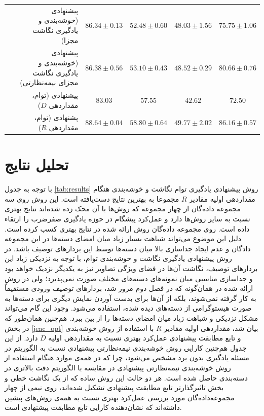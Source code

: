 \begin{table}[ht]
{\begin{tabular}{|r|r|c|c|c|c|}
&  پیشنهادی (خوشه‌بندی و یادگیری نگاشت مجزا)
                          & $86.34 \pm 0.13$               & $52.48 \pm 0.60$              & $48.03 \pm 1.56$              & $75.75 \pm 1.06$ \\
& پیشنهادی (خوشه‌بندی و یادگیری نگاشت مجزای نیمه‌نظارتی)
                        & $86.38 \pm 0.56$              & $ 53.10\pm 0.43 $             & $48.52 \pm 0.29$              &$ 80.66 \pm 0.76$ \\
& پیشنهادی (توام، مقداردهی $D$)
                     & $83.03$                        & $57.55$                       & $42.62$          & $72.50$\\
& پشنهادی (توام، مقداردهی $R$)
                     & \textbf{\em $88.64 \pm 0.04$}  & \textbf{\em $58.80 \pm 0.64$} & $49.77 \pm 2.02$ & \textbf{\em $86.16 \pm 0.57$} \\
\hline
\end{tabular}
}
\end{table}

\section{تحلیل نتایج}\label{exp:discussion}
با توجه به جدول \ref{tab:results} روش پیشنهادی یادگیری توام نگاشت و خوشه‌بندی هنگام مقداردهی اولیه مقادیر $R$ مجموعا به بهترین نتایج دست‌یافته است. این روش روی سه مجموعه داد‌ه‌گان از چهار مجموعه که روش‌ها با آن محک زده شده‌اند نتایج بهتری نسبت به سایر روش‌ها دارد و عمل‌کرد پیشگام در حوزه یادگیری صفرضرب را ارتقاء داده است. روی مجموعه داده‌گان  روش ارائه شده در
\cite{agnostic}
نتایج بهتری کسب کرده است. دلیل این موضوع می‌تواند شباهت بسیار زیاد میان امضای دسته‌ها در این مجموعه دادگان و عدم ایجاد جداسازی بالا میان دسته‌ها توسط این بردارهای توصیف باشد. در روش پیشنهادی یادگیری نگاشت و خوشه‌بندی توام، با توجه به نزدیکی زیاد این بردارهای توصیف، نگاشت آن‌ها در فضای ویژگی تصاویر نیز به یکدیگر نزدیک خواهد بود و جداسازی مناسبی میان نمونه‌های دسته‌های مختلف صورت
نمی‌پذیرد؛ ولی در روش ارائه شده در \cite{agnostic} همان‌گونه که در فصل دوم مرور شد، بردارهای توصیف ورودی
مستقیماً به کار گرفته نمی‌شوند، بلکه از آن‌ها برای بدست آوردن نمایش دیگری برای دسته‌ها  به صورت هیستوگرامی از دسته‌های دیده شده، استفاده می‌شود. وجود این گام می‌تواند مشکل نزدیکی و شباهت زیاد میان امضای دسته‌ها را از بین ببرد. هم‌چنین همان‌طور که در بخش \ref{jeac_opt} بیان شد، مقداردهی اولیه مقادیر $R$ با استفاده از روش خوشه‌بندی و تابع مطابقت پیشنهادی عمل‌کرد بهتری نسبت به مقداردهی اولیه $D$ دارد. از این جدول هم‌چنین کارایی روش خوشه‌بندی نیمه‌نظارتی پیشنهادی نسبت به الگوریتم  در مسئله یادگیری بدون برد مشخص می‌شود، چرا که در همه‌ی موارد هنگام استفاده از روش خوشه‌بندی نیمه‌نظارتی پیشنهادی در مقایسه با  الگوریتم  دقت بالاتری در دسته‌بندی حاصل شده است. هر دو حالت این روش ساده که از یک نگاشت خطی و بخش تاثیرگذارتر تابع مطابقت پیشنهادی تشکیل شده‌اند، روی نیمی از چهار مجموعه‌داده‌گان مورد بررسی عمل‌کرد بهتری نسبت به همه‌ی روش‌های پیشین داشته‌اند که نشان‌دهنده کارایی تابع مطابقت پیشنهادی است.

